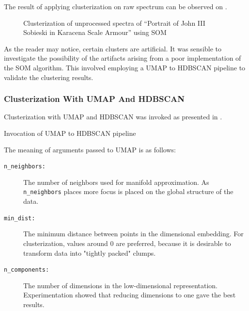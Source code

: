 The result of applying clusterization on raw spectrum can be observed on .

\newpage
\begin{figure}[H] 
  \centering     
   
  \caption{Clusterization of unprocessed spectra of ``Portrait of John III Sobieski in Karacena Scale Armour'' using SOM}
  \label{fig:sobieski_clustered_som_noise}
\end{figure}

As the reader may notice, certain clusters are artificial. 
It was sensible to investigate the possibility of the artifacts arising from a poor implementation of the SOM algorithm.
This involved employing a UMAP to HDBSCAN pipeline to validate the clustering results.

\subsubsection{Clusterization With UMAP And HDBSCAN}
Clusterization with UMAP and HDBSCAN was invoked as presented in .

\newenvironment{longlistingH}{\captionsetup{type=listing, width=0.8\textwidth}}{}
\begin{longlistingH}
    \caption{Invocation of UMAP to HDBSCAN pipeline}
    \label{lst:umap-hdbscan-invocation}
\end{longlistingH}
\vspace{12pt}

The meaning of arguments passed to UMAP is as follows:
\begin{description}
    \item[\texttt{n\_neighbors:}] The number of neighbors used for manifold approximation. As \texttt{n\_neighbors} places more focus is placed on the global structure of the data. 
    \item[\texttt{min\_dist:}] The minimum distance between points in the dimensional embedding. For clusterization, values around 0 are preferred, because it is desirable to transform data into "tightly packed" clumps.
    \item[\texttt{n\_components:}] The number of dimensions in the low-dimensional representation. Experimentation showed that reducing dimensions to one gave the best results. 
\end{description}

